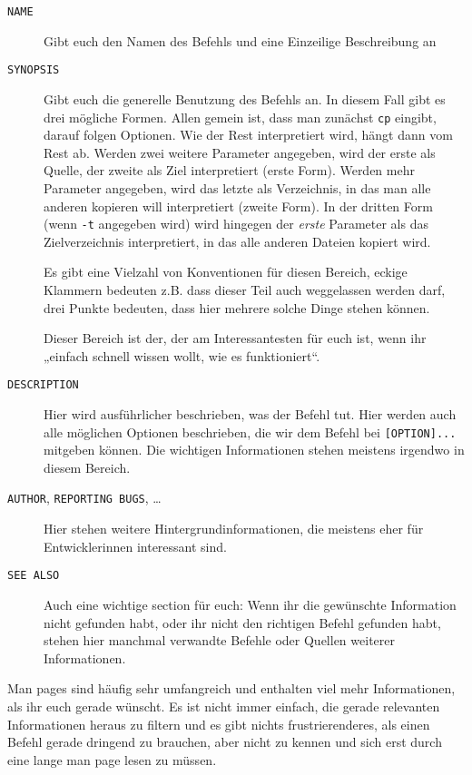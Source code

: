 \begin{description}
    \item[\texttt{NAME}]
        Gibt euch den Namen des Befehls und eine Einzeilige Beschreibung an
    \item[\texttt{SYNOPSIS}]
        Gibt euch die generelle Benutzung des Befehls an. In diesem Fall gibt
        es drei mögliche Formen. Allen gemein ist, dass man zunächst
        \texttt{cp} eingibt, darauf folgen Optionen. Wie der Rest interpretiert
        wird, hängt dann vom Rest ab. Werden zwei weitere Parameter angegeben,
        wird der erste als Quelle, der zweite als Ziel interpretiert (erste
        Form). Werden mehr Parameter angegeben, wird das letzte als
        Verzeichnis, in das man alle anderen kopieren will interpretiert
        (zweite Form). In der dritten Form (wenn \texttt{-t} angegeben wird)
        wird hingegen der \emph{erste} Parameter als das Zielverzeichnis
        interpretiert, in das alle anderen Dateien kopiert wird.

        Es gibt eine Vielzahl von Konventionen für diesen Bereich, eckige
        Klammern bedeuten z.B. dass dieser Teil auch weggelassen werden darf,
        drei Punkte bedeuten, dass hier mehrere solche Dinge stehen können.

        Dieser Bereich ist der, der am Interessantesten für euch ist, wenn ihr
        „einfach schnell wissen wollt, wie es funktioniert“.
    \item[\texttt{DESCRIPTION}]
        Hier wird ausführlicher beschrieben, was der Befehl tut. Hier werden
        auch alle möglichen Optionen beschrieben, die wir dem Befehl bei
        \texttt{[OPTION]...} mitgeben können. Die wichtigen Informationen
        stehen meistens irgendwo in diesem Bereich.
    \item[\texttt{AUTHOR}, \texttt{REPORTING BUGS}, \dots]
        Hier stehen weitere Hintergrundinformationen, die meistens eher für
        Entwicklerinnen interessant sind.
    \item[\texttt{SEE ALSO}]
        Auch eine wichtige section für euch: Wenn ihr die gewünschte
        Information nicht gefunden habt, oder ihr nicht den richtigen Befehl
        gefunden habt, stehen hier manchmal verwandte Befehle oder Quellen
        weiterer Informationen.
\end{description}

Man pages sind häufig sehr umfangreich und enthalten viel mehr Informationen,
als ihr euch gerade wünscht. Es ist nicht immer einfach, die gerade relevanten
Informationen heraus zu filtern und es gibt nichts frustrierenderes, als einen
Befehl gerade dringend zu brauchen, aber nicht zu kennen und sich erst durch
eine lange man page lesen zu müssen.

